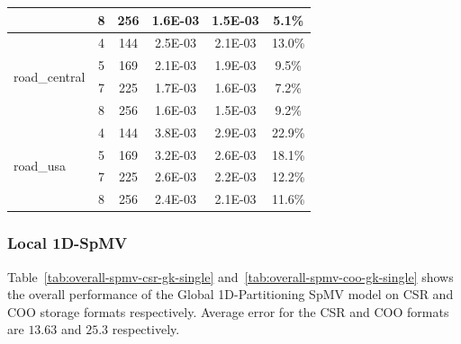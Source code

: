 \documentclass[conference, 10ppt]{IEEEtran}
\begin{document}
\begin{table}[htb]
\begin{tabular}[c]{| l | c | c | c | c | c |}
 &  8  &  256  &  1.6E-03  &  1.5E-03  &  5.1\% \\ \hline
\multirow{4}{*}{road\_central}  &  4  &  144  &  2.5E-03  &  2.1E-03  &  13.0\% \\ \cline{2-6}
 &  5  &  169  &  2.1E-03  &  1.9E-03  &  9.5\% \\ \cline{2-6}
 &  7  &  225  &  1.7E-03  &  1.6E-03  &  7.2\% \\ \cline{2-6}
 &  8  &  256  &  1.6E-03  &  1.5E-03  &  9.2\% \\ \hline
\multirow{4}{*}{road\_usa}  &  4  &  144  &  3.8E-03  &  2.9E-03  &  22.9\% \\ \cline{2-6}
 &  5  &  169  &  3.2E-03  &  2.6E-03  &  18.1\% \\ \cline{2-6}
 &  7  &  225  &  2.6E-03  &  2.2E-03  &  12.2\% \\ \cline{2-6}
 &  8  &  256  &  2.4E-03  &  2.1E-03  &  11.6\% \\ \hline
\end{tabular}
\end{table}


\subsubsection{Local 1D-SpMV}
Table~\ref{tab:overall-spmv-csr-gk-single} and~\ref{tab:overall-spmv-coo-gk-single} shows the overall performance of the Global 1D-Partitioning 
SpMV model on CSR and COO storage formats respectively.  Average error for the CSR and COO formats are 
$13.63$ and $25.3$ respectively. 
\end{document}
